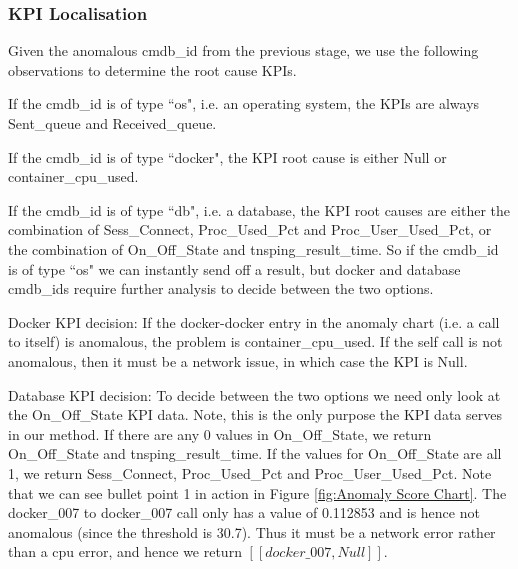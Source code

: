 \documentclass[12pt]{article}
\let\tempone\itemize
\let\temptwo\enditemize
\let\tempthree\enumerate
\let\tempfour\endenumerate
\renewenvironment{itemize}{\tempone\setlength{\itemsep}{0pt}}{\temptwo}
\renewenvironment{enumerate}{\tempthree\setlength{\itemsep}{0pt}}{\tempfour}
\begin{document}
\subsubsection{KPI Localisation}
Given the anomalous cmdb\_id from the previous stage, we use the following observations to determine the root cause KPIs. 
\begin{itemize}
    \item If the cmdb\_id is of type ``os", i.e. an operating system, the KPIs are always Sent\_queue and Received\_queue.
    \item If the cmdb\_id is of type ``docker", the KPI root cause is either Null or container\_cpu\_used.
    \item If the cmdb\_id is of type ``db", i.e. a database, the KPI root causes are either the combination of Sess\_Connect, Proc\_Used\_Pct and Proc\_User\_Used\_Pct, or the combination of On\_Off\_State and tnsping\_result\_time.
\end{itemize}
So if the cmdb\_id is of type ``os" we can instantly send off a result, but docker and database cmdb\_ids require further analysis to decide between the two options. 
\begin{enumerate}
    \item Docker KPI decision: If the docker-docker entry in the anomaly chart (i.e. a call to itself) is anomalous, the problem is container\_cpu\_used. If the self call is not anomalous, then it must be a network issue, in which case the KPI is Null.
    \item Database KPI decision: To decide between the two options we need only look at the On\_Off\_State KPI data. Note, this is the only purpose the KPI data serves in our method. If there are any 0 values in On\_Off\_State, we return On\_Off\_State and tnsping\_result\_time. If the values for On\_Off\_State are all 1, we return Sess\_Connect, Proc\_Used\_Pct and Proc\_User\_Used\_Pct.
\end{enumerate}
Note that we can see bullet point 1 in action in Figure \ref{fig:Anomaly Score Chart}. The docker\_007 to docker\_007 call only has a value of 0.112853 and is hence not anomalous (since the threshold is 30.7). Thus it must be a network error rather than a cpu error, and hence we return $[[docker\_007, Null]]$.
\end{document}
